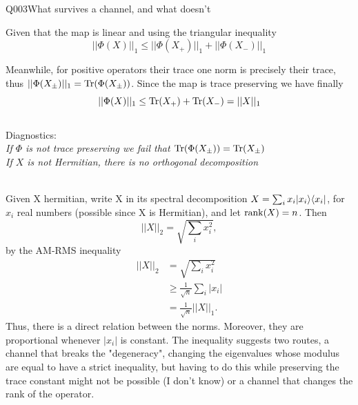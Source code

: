 \begin{entry}{Q003}{What survives a channel, and what doesn't}
\begin{solution}[Part (a)]
Given that the map is linear and using the triangular inequality
$$||\Phi(X)||_1\leq ||\Phi(X_+)||_1 + ||\Phi(X_-)||_1$$

Meanwhile, for positive operators their trace one norm is precisely their trace, thus $||\Phi(X_{\pm})||_1 = \operatorname{Tr}(\Phi(X_{\pm}))$. Since the map is trace preserving we have finally $$||\Phi(X)||_1 \leq \operatorname{Tr}(X_+) + \operatorname{Tr}(X_-) = ||X||_1$$
\\
Diagnostics:\\
\emph{If $\Phi$ is not trace preserving we fail that $\operatorname{Tr}(\Phi(X_{\pm}))=\operatorname{Tr}(X_{\pm})$}\\
\emph{If $X$ is not Hermitian, there is no orthogonal decomposition} 
\end{solution}

\begin{solution}[Part (b)]
\\
Given X hermitian, write X in its spectral decomposition $X=\sum_i x_i \lvert x_i \rangle\langle x_i \rvert$, for $x_i$ real numbers (possible since X is Hermitian), and let $\operatorname{rank}(X)=n$. Then 
$$||X||_2=\sqrt{\sum_i x_i^2},$$ by the AM-RMS inequality
\begin{equation}
    \begin{split}
        ||X||_2&=\sqrt{\sum_i x_i^2}\\
        &\geq \frac{1}{\sqrt{n}}\sum_i|x_i|\\
        &= \frac{1}{\sqrt{n}} ||X||_1.
    \end{split}
    \label{ineq norms}
\end{equation}
Thus, there is a direct relation between the norms. Moreover, they are proportional whenever $|x_i|$ is constant.
The inequality suggests two routes, a channel that breaks the "degeneracy", changing the eigenvalues whose modulus are equal to have a strict inequality, but having to do this while preserving the trace constant might not be possible (I don't know) or a channel that changes the rank of the operator.


\end{solution}
\end{entry}
